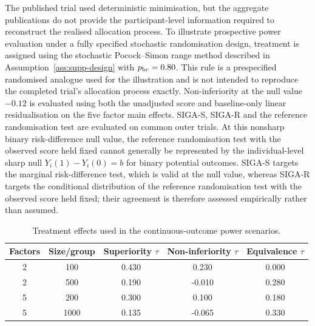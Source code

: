 \documentclass[12pt,a4paper]{article}
\theoremstyle{definition}
\theoremstyle{remark}\newtheorem{remark}{Remark}
\numberwithin{equation}{section}
\begin{document}
The published trial used deterministic minimisation, but the aggregate publications do not provide the participant-level information required to reconstruct the realised allocation process. To illustrate prospective power evaluation under a fully specified stochastic randomisation design, treatment is assigned using the stochastic Pocock--Simon range method described in Assumption~\ref{ass:supp-design} with $p_{\rm bc}=0.80$. This rule is a prespecified randomised analogue used for the illustration and is not intended to reproduce the completed trial's allocation process exactly. Non-inferiority at the null value $-0.12$ is evaluated using both the unadjusted score and baseline-only linear residualisation on the five factor main effects. SIGA-S, SIGA-R and the reference randomisation test are evaluated on common outer trials. At this nonsharp binary risk-difference null value, the reference randomisation test with the observed score held fixed cannot generally be represented by the individual-level sharp null $Y_i(1)-Y_i(0)=b$ for binary potential outcomes. SIGA-S targets the marginal risk-difference test, which is valid at the null value, whereas SIGA-R targets the conditional distribution of the reference randomisation test with the observed score held fixed; their agreement is therefore assessed empirically rather than assumed.


\renewcommand{\tablename}{Supplementary Table}
\setcounter{table}{0}

\begin{table}[!htbp]
\centering
\caption{Treatment effects used in the continuous-outcome power scenarios.}
\label{tab:power-effects}
\normalsize
\setlength{\tabcolsep}{8pt}
\renewcommand{\arraystretch}{1.10}
\begin{tabular}{ccccc}
\toprule
Factors & Size/group & Superiority $\tau$ & Non-inferiority $\tau$ & Equivalence $\tau$ \\
\midrule
2 & 100 & 0.430 & 0.230 & 0.000 \\
2 & 500 & 0.190 & -0.010 & 0.280 \\
5 & 200 & 0.300 & 0.100 & 0.180 \\
5 & 1000 & 0.135 & -0.065 & 0.330 \\
\bottomrule
\end{tabular}
\end{table}
\end{document}
